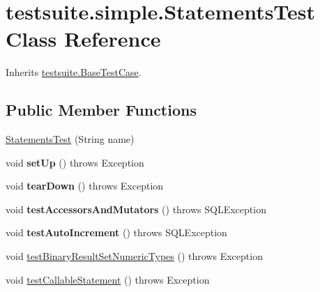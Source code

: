\hypertarget{classtestsuite_1_1simple_1_1_statements_test}{}\section{testsuite.\+simple.\+Statements\+Test Class Reference}
\label{classtestsuite_1_1simple_1_1_statements_test}


Inherits \mbox{\hyperlink{classtestsuite_1_1_base_test_case}{testsuite.\+Base\+Test\+Case}}.

\subsection*{Public Member Functions}
\begin{DoxyCompactItemize}
\item 
\mbox{\hyperlink{classtestsuite_1_1simple_1_1_statements_test_a7cfee1c515cf25d0fa2f99e45a10c76b}{Statements\+Test}} (String name)
\item 
\mbox{\label{classtestsuite_1_1simple_1_1_statements_test_a49ab77bad20dc259d9978a4f3566f2ae}} 
void {\bfseries set\+Up} ()  throws Exception 
\item 
\mbox{\label{classtestsuite_1_1simple_1_1_statements_test_a99769a3bf4c9af2e19ac153633177043}} 
void {\bfseries tear\+Down} ()  throws Exception 
\item 
\mbox{\label{classtestsuite_1_1simple_1_1_statements_test_a14f251093874f75fcc06d42b53c2fb1f}} 
void {\bfseries test\+Accessors\+And\+Mutators} ()  throws S\+Q\+L\+Exception 
\item 
\mbox{\label{classtestsuite_1_1simple_1_1_statements_test_abf02e6d8b359939dafd7b1712e07be01}} 
void {\bfseries test\+Auto\+Increment} ()  throws S\+Q\+L\+Exception 
\item 
void \mbox{\hyperlink{classtestsuite_1_1simple_1_1_statements_test_a8686a9137f5901a701020342f04dc3a7}{test\+Binary\+Result\+Set\+Numeric\+Types}} ()  throws Exception 
\item 
void \mbox{\hyperlink{classtestsuite_1_1simple_1_1_statements_test_a575857630ae7ba0e8a97025a9d5d772f}{test\+Callable\+Statement}} ()  throws Exception 

\end{DoxyCompactItemize}
